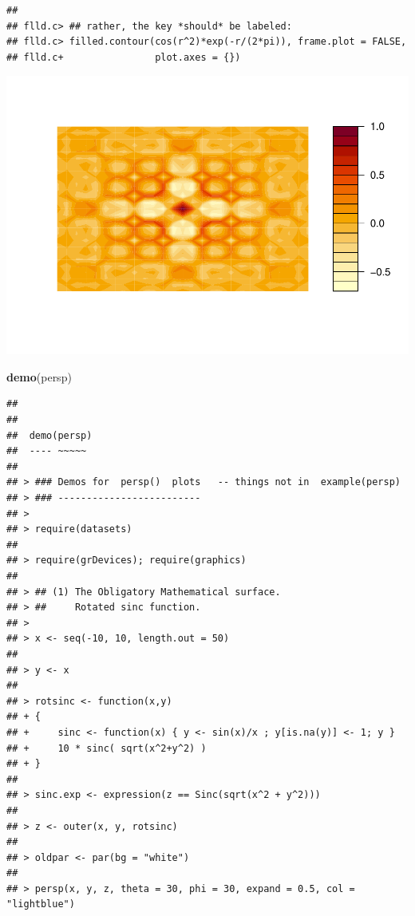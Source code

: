 \documentclass[]{book}
\newenvironment{Shaded}{\begin{snugshade}}{\end{snugshade}}
\newcommand{\KeywordTok}[1]{\textcolor[rgb]{0.13,0.29,0.53}{\textbf{#1}}}
\newcommand{\NormalTok}[1]{#1}
\begin{document}
\begin{verbatim}
## 
## flld.c> ## rather, the key *should* be labeled:
## flld.c> filled.contour(cos(r^2)*exp(-r/(2*pi)), frame.plot = FALSE,
## flld.c+                plot.axes = {})
\end{verbatim}

\includegraphics{TudodoR_files/figure-latex/unnamed-chunk-145-8.pdf}

\begin{Shaded}
\begin{Highlighting}[]
\KeywordTok{demo}\NormalTok{(persp)}
\end{Highlighting}
\end{Shaded}

\begin{verbatim}
## 
## 
##  demo(persp)
##  ---- ~~~~~
## 
## > ### Demos for  persp()  plots   -- things not in  example(persp)
## > ### -------------------------
## > 
## > require(datasets)
## 
## > require(grDevices); require(graphics)
## 
## > ## (1) The Obligatory Mathematical surface.
## > ##     Rotated sinc function.
## > 
## > x <- seq(-10, 10, length.out = 50)
## 
## > y <- x
## 
## > rotsinc <- function(x,y)
## + {
## +     sinc <- function(x) { y <- sin(x)/x ; y[is.na(y)] <- 1; y }
## +     10 * sinc( sqrt(x^2+y^2) )
## + }
## 
## > sinc.exp <- expression(z == Sinc(sqrt(x^2 + y^2)))
## 
## > z <- outer(x, y, rotsinc)
## 
## > oldpar <- par(bg = "white")
## 
## > persp(x, y, z, theta = 30, phi = 30, expand = 0.5, col = "lightblue")
\end{verbatim}
\end{document}
